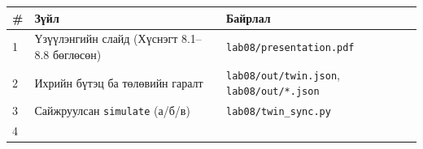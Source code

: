 \begingroup\scriptsize\begin{longtable}[]{@{}lll@{}}
\toprule
\begin{minipage}[b]{0.30\columnwidth}\raggedright
\#\strut
\end{minipage} & \begin{minipage}[b]{0.30\columnwidth}\raggedright
Зүйл\strut
\end{minipage} & \begin{minipage}[b]{0.30\columnwidth}\raggedright
Байрлал\strut
\end{minipage}\tabularnewline
\midrule
\endhead
\begin{minipage}[t]{0.30\columnwidth}\raggedright
1\strut
\end{minipage} & \begin{minipage}[t]{0.30\columnwidth}\raggedright
Үзүүлэнгийн слайд (Хүснэгт 8.1--8.8 бөглөсөн)\strut
\end{minipage} & \begin{minipage}[t]{0.30\columnwidth}\raggedright
\texttt{lab08/\allowbreak{}presentation.\allowbreak{}pdf}\strut
\end{minipage}\tabularnewline
\begin{minipage}[t]{0.30\columnwidth}\raggedright
2\strut
\end{minipage} & \begin{minipage}[t]{0.30\columnwidth}\raggedright
Ихрийн бүтэц ба төлөвийн гаралт\strut
\end{minipage} & \begin{minipage}[t]{0.30\columnwidth}\raggedright
\texttt{lab08/\allowbreak{}out/\allowbreak{}twin.\allowbreak{}json}, \texttt{lab08/out/*.json}\strut
\end{minipage}\tabularnewline
\begin{minipage}[t]{0.30\columnwidth}\raggedright
3\strut
\end{minipage} & \begin{minipage}[t]{0.30\columnwidth}\raggedright
Сайжруулсан \texttt{simulate} (а/б/в)\strut
\end{minipage} & \begin{minipage}[t]{0.30\columnwidth}\raggedright
\texttt{lab08/\allowbreak{}twin\_\allowbreak{}sync.\allowbreak{}py}\strut
\end{minipage}\tabularnewline
\begin{minipage}[t]{0.30\columnwidth}\raggedright
4\strut
\end{minipage} & \begin{minipage}[t]{0.30\columnwidth}\raggedright

\end{minipage}
\end{longtable}
